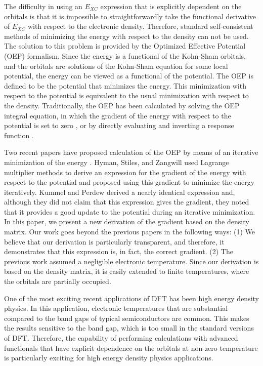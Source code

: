 \documentclass{article}
\begin{document}
The difficulty in using an $E_{XC}$ expression that is explicitly dependent on
the orbitals is that it is impossible to straightforwardly take the functional
derivative of $E_{XC}$ with respect to the electronic density.  Therefore,
standard self-consistent methods of minimizing the energy with respect to the
density can not be used.  The solution to this problem is provided by the
Optimized Effective Potential (OEP) formalism.  Since the energy is a functional
of the Kohn-Sham orbitals, and the orbitals are solutions of the Kohn-Sham
equation for some local potential, the energy can be viewed as a functional
of the potential.  The OEP is defined to be the potential that minimizes
the energy.  This minimization with respect to the potential is equivalent
to the usual minimization with respect to the density.  Traditionally, the OEP
has been calculated by solving the OEP integral equation, in which the gradient
of the energy with respect to the potential is set to zero \cite{TalmanShadwick:76,
SahniGruenebaumPerdew:82,EngelVosko:93,Kotani:95},
or by directly evaluating and inverting a response function \cite{GorlingLevy:94,
StadeleMajewskiVoglGorling:97,Gorling99}.

Two recent papers have proposed calculation of the OEP by means of an iterative minimization
of the energy \cite{HymanStilesZangwill:00,KummelPerdew:03}.  Hyman, Stiles, and Zangwill
used Lagrange multiplier methods to derive an expression for the gradient of the energy
with respect to the potential and proposed using this gradient to minimize the
energy iteratively.  Kummel and Perdew derived a nearly identical expression and,
although they did not claim that this expression gives the gradient, they noted
that it provides a good update to the potential during an iterative minimization.
In this paper, we present a new derivation of the gradient based on the
density matrix.  Our work goes beyond the previous papers in the following ways:
(1) We believe that our derivation is particularly transparent, and therefore,
it demonstrates that this expression is, in fact, the correct gradient.
(2)  The previous work assumed a negligible electronic temperature.  Since our
derivation is based on the density matrix, it is easily extended to finite
temperatures, where the orbitals are partially occupied.

One of the most exciting recent applications of DFT has been high energy density
physics.  In this application, electronic temperatures that are substantial
compared to the band gaps of typical semiconductors are common.  This makes
the results sensitive to the band gap, which is too small in the standard
versions of DFT. Therefore, the capability of performing calculations with
advanced functionals that have explicit dependence on the orbitals at
non-zero temperature is particularly exciting for high energy density physics
applications.
\end{document}
